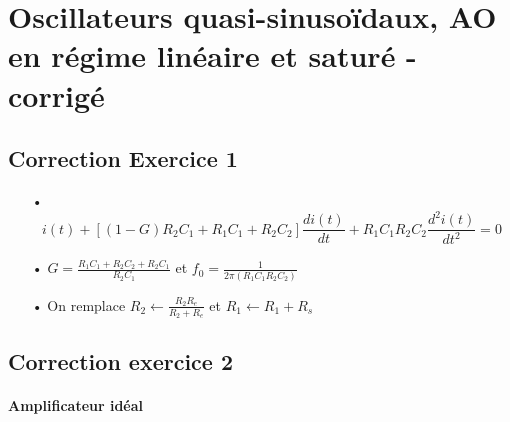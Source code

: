 \documentclass{report}
\begin{document}
\chapter*{Oscillateurs quasi-sinusoïdaux, AO en régime linéaire et saturé - corrigé}

\newpage

\section*{Correction Exercice 1}

\begin{itemize}
	\item[•] 
	\begin{equation}
		i(t) + \left[(1-G)R_2C_1 +R_1C_1+R_2C_2\right]\frac{di(t)}{dt}+R_1C_1R_2C_2\frac{d^2i(t)}{dt^2}=0 
	\end{equation}
	\item[•]  $G=\frac{R_1C_1+R_2C_2+R_2C_1}{R_2C_1}$ et $f_0=\frac{1}{2\pi(R_1C_1R_2C_2)}$
	\item[•] On remplace $R_2\leftarrow\frac{R_2R_e}{R_2+R_e}$ et $R_1\leftarrow R_1+R_s$
\end{itemize}

\section*{Correction exercice 2}

\subsubsection{Amplificateur idéal}
\end{document}
